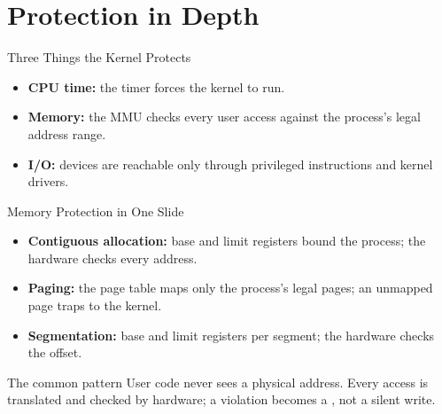 \documentclass[aspectratio=169]{beamer}
\begin{document}
\section{Protection in Depth}


\begin{frame}{Three Things the Kernel Protects}
  \centering
  \vspace{0.35cm}
  \begin{itemize}
    \item \textbf{CPU time:} the timer forces the kernel to run.
    \item \textbf{Memory:} the MMU checks every user access against the
      process's legal address range.
    \item \textbf{I/O:} devices are reachable only through privileged
      instructions and kernel drivers.
  \end{itemize}
\end{frame}

\begin{frame}{Memory Protection in One Slide}
  \begin{itemize}
    \item \textbf{Contiguous allocation:} base and limit registers bound the
      process; the hardware checks every address.
    \item \textbf{Paging:} the page table maps only the process's legal pages;
      an unmapped page traps to the kernel.
    \item \textbf{Segmentation:} base and limit registers per segment; the
      hardware checks the offset.
  \end{itemize}
  \vspace{0.2cm}
  \begin{block}{The common pattern}
    User code never sees a physical address. Every access is translated and
    checked by hardware; a violation becomes a , not a silent write.
  \end{block}
\end{frame}
\end{document}
